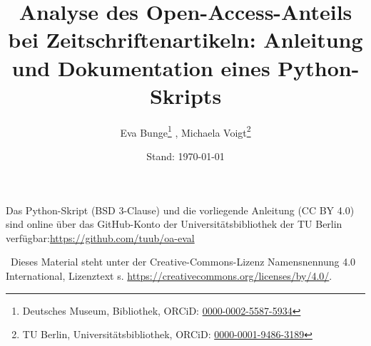 \documentclass[a4paper,11pt]{scrartcl}
\title{\Large Analyse des Open-Access-Anteils bei Zeitschriftenartikeln: Anleitung und Dokumentation eines Python-Skripts}
\author{\normalsize
Eva Bunge\thanks{Deutsches Museum, Bibliothek, ORCiD: \href{http://orcid.org/0000-0002-5587-5934}{0000-0002-5587-5934}} , 
Michaela Voigt\thanks{TU Berlin, Universitätsbibliothek, ORCiD: \href{http://orcid.org/0000-0001-9486-3189}{0000-0001-9486-3189}}}
\date{\normalsize Stand: \today}
\begin{document}
\maketitle
Das Python-Skript (BSD 3-Clause) und die vorliegende Anleitung (CC BY 4.0) sind online über das GitHub-Konto der Universitätsbibliothek der TU Berlin verfügbar:\newline \url{https://github.com/tuub/oa-eval}

\ccLogo \ccAttribution\ Dieses Material steht unter der Creative-Commons-Lizenz Namensnennung 4.0 Inter\-national, Lizenztext s. \url{https://creativecommons.org/licenses/by/4.0/}.

\tableofcontents
\pagebreak

\pagestyle{fancy}




\end{document}
